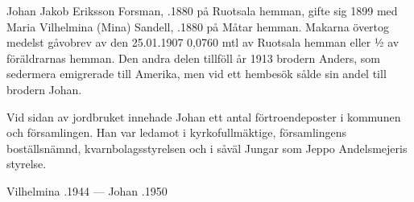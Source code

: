 
Johan Jakob Eriksson Forsman, .1880 på Ruotsala hemman, gifte sig 1899 med Maria Vilhelmina (Mina) Sandell, .1880 på Måtar hemman. Makarna övertog medelst gåvobrev av den 25.01.1907  0,0760 mtl av Ruotsala hemman eller ½ av föräldrarnas hemman. Den andra delen tillföll år 1913 brodern Anders, som sedermera emigrerade till Amerika, men vid ett hembesök sålde sin andel till brodern Johan.

Vid sidan av jordbruket innehade Johan ett antal förtroendeposter i kommunen och församlingen. Han var ledamot i kyrkofullmäktige, församlingens boställsnämnd, kvarnbolagsstyrelsen och i såväl Jungar som Jeppo Andelsmejeris styrelse.
\begin{jhchildren}
  \item {}
  \item {}
  \item {}
  \item {}
  \item {}
  \item {}
  \item {}
  \item {}
  \item {}
  \item {}
  \item {}
  \item {}
\end{jhchildren}

Vilhelmina .1944  ---  Johan .1950


